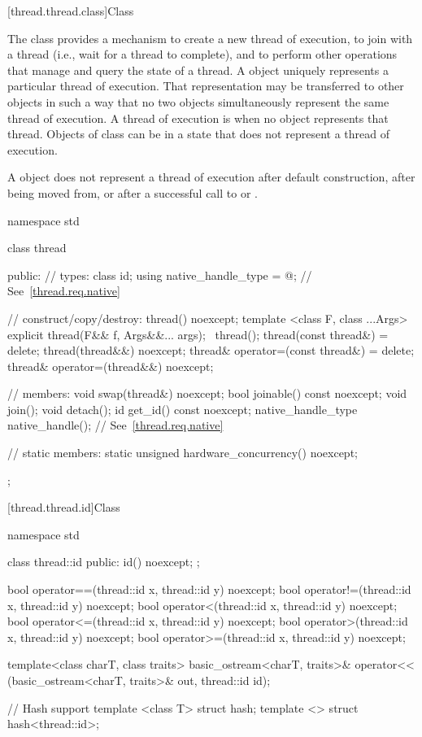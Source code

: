 [thread.thread.class]{Class }

\pnum
The class  provides a mechanism to create a new thread of execution, to join with
a thread (i.e., wait for a thread to complete), and to perform other operations that manage and
query the state of a thread. A  object uniquely represents a particular thread of
execution. That representation may be transferred to other  objects in such a way
that no two  objects simultaneously represent the same thread of execution. A
thread of execution is  when no  object represents that thread.
Objects of class  can be in a state that does not represent a thread of
execution. \begin{note} A  object does not represent a thread of execution after
default construction, after being moved from, or after a successful call to  or
. \end{note}

\begin{codeblock}
namespace std {
  class thread {
  public:
    // types:
    class id;
    using native_handle_type = @\impdef@; // See~\ref{thread.req.native}

    // construct/copy/destroy:
    thread() noexcept;
    template <class F, class ...Args> explicit thread(F&& f, Args&&... args);
    ~thread();
    thread(const thread&) = delete;
    thread(thread&&) noexcept;
    thread& operator=(const thread&) = delete;
    thread& operator=(thread&&) noexcept;

    // members:
    void swap(thread&) noexcept;
    bool joinable() const noexcept;
    void join();
    void detach();
    id get_id() const noexcept;
    native_handle_type native_handle(); // See~\ref{thread.req.native}

    // static members:
    static unsigned hardware_concurrency() noexcept;
  };
}
\end{codeblock}

[thread.thread.id]{Class }

%
%
\begin{codeblock}
namespace std {
  class thread::id {
  public:
      id() noexcept;
  };

  bool operator==(thread::id x, thread::id y) noexcept;
  bool operator!=(thread::id x, thread::id y) noexcept;
  bool operator<(thread::id x, thread::id y) noexcept;
  bool operator<=(thread::id x, thread::id y) noexcept;
  bool operator>(thread::id x, thread::id y) noexcept;
  bool operator>=(thread::id x, thread::id y) noexcept;

  template<class charT, class traits>
    basic_ostream<charT, traits>&
      operator<< (basic_ostream<charT, traits>& out, thread::id id);

  // Hash support
  template <class T> struct hash;
  template <> struct hash<thread::id>;
}
\end{codeblock}

